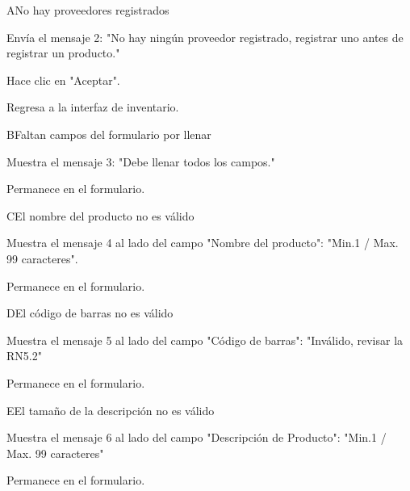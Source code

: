 \begin{UCtrayectoriaA}{A}{No hay proveedores registrados}
	
	\UCpaso[\UCsist] Envía el mensaje 2: "No hay ningún proveedor registrado, registrar uno antes de registrar un producto."

	\UCpaso[\UCactor] Hace clic en "Aceptar".

	\UCpaso[] Regresa a la interfaz de inventario.

\end{UCtrayectoriaA}

\begin{UCtrayectoriaA}{B}{Faltan campos del formulario por llenar}
	
	\UCpaso[\UCsist] Muestra el mensaje 3: "Debe llenar todos los campos."

	\UCpaso[] Permanece en el formulario.

\end{UCtrayectoriaA}

\begin{UCtrayectoriaA}{C}{El nombre del producto no es válido}
	
	\UCpaso[\UCsist] Muestra el mensaje 4 al lado del campo "Nombre del producto": "Min.1 / Max. 99 caracteres".

	\UCpaso[] Permanece en el formulario.

\end{UCtrayectoriaA}
\begin{UCtrayectoriaA}{D}{El código de barras no es válido}
	
	\UCpaso[\UCsist] Muestra el mensaje 5 al lado del campo "Código de barras": "Inválido, revisar la RN5.2"

	\UCpaso[] Permanece en el formulario.

\end{UCtrayectoriaA}
\begin{UCtrayectoriaA}{E}{El tamaño de la descripción no es válido}
	
	\UCpaso[\UCsist] Muestra el mensaje 6 al lado del campo "Descripción de Producto": "Min.1 / Max. 99 caracteres"

	\UCpaso[] Permanece en el formulario.

\end{UCtrayectoriaA}

